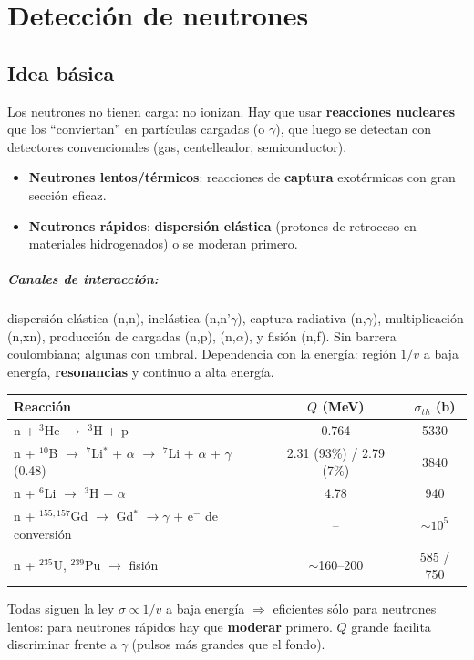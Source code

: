 \chapter{Detección de neutrones}

\section{Idea básica}
\begin{clave}
Los neutrones no tienen carga: no ionizan. Hay que usar \textbf{reacciones nucleares} que los ``conviertan'' en partículas
cargadas (o $\gamma$), que luego se detectan con detectores convencionales (gas, centelleador, semiconductor).
\begin{itemize}
\item \textbf{Neutrones lentos/térmicos}: reacciones de \textbf{captura} exotérmicas con gran sección eficaz.
\item \textbf{Neutrones rápidos}: \textbf{dispersión elástica} (protones de retroceso en materiales hidrogenados) o se moderan primero.
\end{itemize}
\end{clave}

\paragraph{Canales de interacción:} dispersión elástica (n,n), inelástica (n,n'$\gamma$), captura radiativa (n,$\gamma$), multiplicación
(n,xn), producción de cargadas (n,p), (n,$\alpha$), y fisión (n,f). Sin barrera coulombiana; algunas con umbral.
Dependencia con la energía: región \textbf{$1/v$} a baja energía, \textbf{resonancias} y continuo a alta energía.

\begin{clave}
\begin{center}
\begin{tabular}{lcc}
\toprule
Reacción & $Q$ (MeV) & $\sigma_{th}$ (b)\\
\midrule
n + $^3$He $\to$ $^3$H + p & 0.764 & 5330\\
n + $^{10}$B $\to$ $^7$Li$^*$ + $\alpha$ $\to$ $^7$Li + $\alpha$ + $\gamma$(0.48) & 2.31 (93\%) / 2.79 (7\%) & 3840\\
n + $^6$Li $\to$ $^3$H + $\alpha$ & 4.78 & 940\\
n + $^{155,157}$Gd $\to$ Gd$^*$ $\to\gamma$ + e$^-$ de conversión & -- & $\sim10^5$\\
n + $^{235}$U, $^{239}$Pu $\to$ fisión & $\sim$160--200 & 585 / 750\\
\bottomrule
\end{tabular}
\end{center}
Todas siguen la ley \textbf{$\sigma\propto1/v$} a baja energía $\Rightarrow$ eficientes sólo para neutrones lentos: para neutrones rápidos hay
que \textbf{moderar} primero. $Q$ grande facilita discriminar frente a $\gamma$ (pulsos más grandes que el fondo).
\end{clave}

